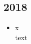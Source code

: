 \subsection{2018}
\begin{history}


    \begin{itemize}

        \item x\\
              text

    \end{itemize}

\end{history}
